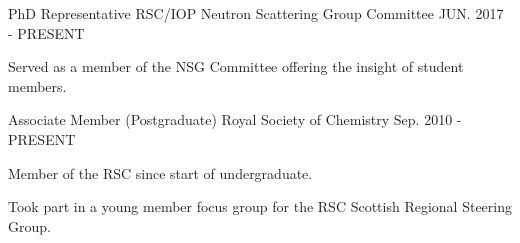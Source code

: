 \begin{cventries}
  \cventry 
  	{PhD Representative}
    {RSC/IOP Neutron Scattering Group Committee}
    {}
    {JUN. 2017 - PRESENT}
    {
      \begin{cvitems}
      	\item {Served as a member of the NSG Committee offering the insight of student members.}
	  \end{cvitems}
	}
  \cventry
    {Associate Member (Postgraduate)}
    {Royal Society of Chemistry}
    {}
    {Sep. 2010 - PRESENT}
    {
      \begin{cvitems}
      	\item {Member of the RSC since start of undergraduate.}
        \item {Took part in a young member focus group for the RSC Scottish Regional Steering Group.}
      \end{cvitems}
    }
\end{cventries}

